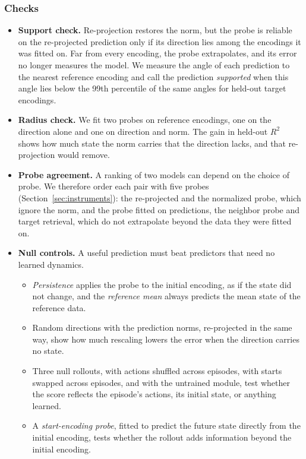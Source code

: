 \subsubsection{Checks}
\label{sec:checks}
\begin{itemize}
\item \textbf{Support check.} Re-projection restores the norm, but the probe is reliable on the re-projected prediction only if its direction lies among the encodings it was fitted on. Far from every encoding, the probe extrapolates, and its error no longer measures the model. We measure the angle of each prediction to the nearest reference encoding and call the prediction \emph{supported} when this angle lies below the 99th percentile of the same angles for held-out target encodings.
\item \textbf{Radius check.} We fit two probes on reference encodings, one on the direction alone and one on direction and norm. The gain in held-out $R^2$ shows how much state the norm carries that the direction lacks, and that re-projection would remove.
\item \textbf{Probe agreement.} A ranking of two models can depend on the choice of probe. We therefore order each pair with five probes (Section~\ref{sec:instruments}): the re-projected and the normalized probe, which ignore the norm, and the probe fitted on predictions, the neighbor probe and target retrieval, which do not extrapolate beyond the data they were fitted on.
\item \textbf{Null controls.} A useful prediction must beat predictors that need no learned dynamics.
\begin{itemize}
\item \emph{Persistence} applies the probe to the initial encoding, as if the state did not change, and the \emph{reference mean} always predicts the mean state of the reference data.
\item Random directions with the prediction norms, re-projected in the same way, show how much rescaling lowers the error when the direction carries no state.
\item Three null rollouts, with actions shuffled across episodes, with starts swapped across episodes, and with the untrained module, test whether the score reflects the episode's actions, its initial state, or anything learned.
\item A \emph{start-encoding probe}, fitted to predict the future state directly from the initial encoding, tests whether the rollout adds information beyond the initial encoding.
\end{itemize}
\end{itemize}

